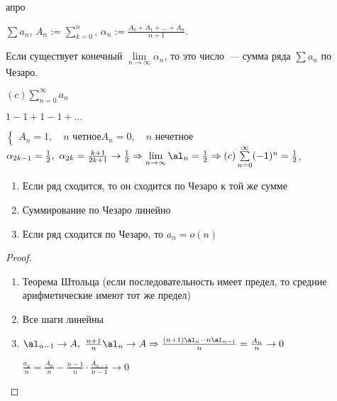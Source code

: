апро\begin{definition}
    $\sum a_n$, $A_n := \sum\limits_{k = 0}^{n}$,
    $\alpha_n := \frac{A_0 + A_1 + \ldots + A_n}{n + 1}$.

    Если существует конечный  $\lim\limits_{n \to \infty}\alpha_n$,
    то это число~--- сумма ряда $\sum a_n$ по Чезаро.
\end{definition}

\begin{designation}
    $(c) \sum\limits_{n = 0}^\infty a_n$
\end{designation}

\begin{example}
    $1 - 1 + 1 - 1 + \ldots$
    
    $\begin{cases}
            A_n = 1,\quad n \text{ четное}   
            
            A_n = 0,\quad n \text{ нечетное} 
            
        \end{cases}$ $\alpha_{2k -1} = \frac{1}{2},\ \alpha_{2k} = \frac{k + 1}{2k + 1} \to \frac{1}{2} \Rightarrow
        \lim\limits_{n \to \infty}\al_n = \frac{1}{2} \Rightarrow (c)\sum\limits_{n = 0}^\infty (-1)^n = \frac{1}{2}$,
\end{example}

\begin{theorem}
    \leavevmode
    \begin{enumerate}
        \item Если ряд сходится, то он сходится по Чезаро к той же сумме
        \item Суммирование по Чезаро линейно
        \item Если ряд сходится по Чезаро, то $a_n = o(n)$
    \end{enumerate}
\end{theorem}

\begin{proof}
    \leavevmode
    \begin{enumerate}
        \item Теорема Штольца (если последовательность имеет предел, то средние арифметические имеют тот же предел)
        \item Все шаги линейны
        \item $\al_{n-1} \to A,\ \frac{n+1}{n}\al_n \to A \Rightarrow \frac{(n+1)\al_{n} - n\al_{n-1}}{n} = \frac{A_n}{n} \to 0$
        
              $\frac{a_n}{n} = \frac{A_n}{n} - \frac{n - 1}{n} \cdot \frac{A_{n-1}}{n -1} \to 0$
    \end{enumerate}
\end{proof}

